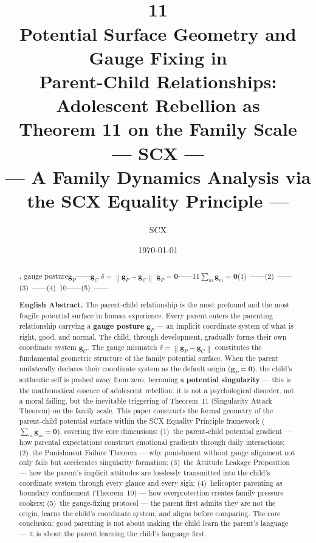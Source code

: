 \documentclass[11pt,a4paper]{article}
\title{
  \textbf{\\
  11}\\[8pt]
  \large
  Potential Surface Geometry and Gauge Fixing in\\
  Parent-Child Relationships: Adolescent Rebellion as\\
  Theorem 11 on the Family Scale\\[6pt]
  \normalsize
  ---  SCX  ---\\
  --- A Family Dynamics Analysis via the SCX Equality Principle ---
}
\author{SCX}
\date{\today}
\newcommand{\norm}[1]{\left\lVert#1\right\rVert}
\newcommand{\sumgd}{\sum_m \mathbf{g}_m = \mathbf{0}}
\begin{document}
\maketitle

\begin{abstract}

\noindent\textbf{.}
\textbf{}gauge posture$\mathbf{g}_P$——$\mathbf{g}_C$ $\delta = \norm{\mathbf{g}_P - \mathbf{g}_C}$ $\mathbf{g}_P = \mathbf{0}$\textbf{}——11$\sumgd$(1)~——(2)~——(3)~——(4)~10——(5)~——

\medskip
\noindent\textbf{English Abstract.}
The parent-child relationship is the most profound and the most fragile potential surface in human experience. Every parent enters the parenting relationship carrying a \textbf{gauge posture} $\mathbf{g}_P$ — an implicit coordinate system of what is right, good, and normal. The child, through development, gradually forms their own coordinate system $\mathbf{g}_C$. The gauge mismatch $\delta = \norm{\mathbf{g}_P - \mathbf{g}_C}$ constitutes the fundamental geometric structure of the family potential surface. When the parent unilaterally declares their coordinate system as the default origin ($\mathbf{g}_P = \mathbf{0}$), the child's authentic self is pushed away from zero, becoming a \textbf{potential singularity} — this is the mathematical essence of adolescent rebellion: it is not a psychological disorder, not a moral failing, but the inevitable triggering of Theorem~11 (Singularity Attack Theorem) on the family scale. This paper constructs the formal geometry of the parent-child potential surface within the SCX Equality Principle framework ($\sumgd$), covering five core dimensions: (1)~the parent-child potential gradient — how parental expectations construct emotional gradients through daily interactions; (2)~the Punishment Failure Theorem — why punishment without gauge alignment not only fails but accelerates singularity formation; (3)~the Attitude Leakage Proposition — how the parent's implicit attitudes are losslessly transmitted into the child's coordinate system through every glance and every sigh; (4)~helicopter parenting as boundary confinement (Theorem~10) — how overprotection creates family pressure cookers; (5)~the gauge-fixing protocol — the parent first admits they are not the origin, learns the child's coordinate system, and aligns before comparing. The core conclusion: good parenting is not about making the child learn the parent's language — it is about the parent learning the child's language first.

\end{abstract}
\end{document}
